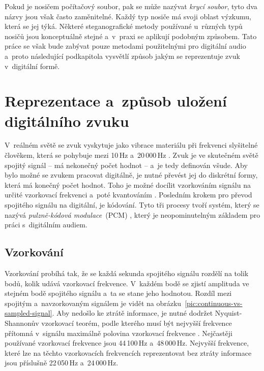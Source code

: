 Pokud je nosičem počítačový soubor, pak se může nazývat \textit{krycí soubor},
tyto dva názvy jsou však často zaměnitelné. Každý typ nosiče má svoji oblast
výzkumu, která se jej týká. Některé steganografické metody používané u~různých
typů nosičů jsou konceptuálně stejné a~v~praxi se aplikují podobným způsobem.
Tato práce se však bude zabývat pouze metodami použitelnými pro digitální
audio a~proto následující podkapitola vysvětlí způsob jakým se reprezentuje
zvuk v~digitální formě.

\section{Reprezentace a~způsob uložení digitálního zvuku}
\label{sec:digital-sound-representation}

V~reálném světě se zvuk vyskytuje jako vibrace materiálu při frekvenci
slyšitelné člověkem, která se pohybuje mezi 10\,Hz a~20\,000\,Hz
\cite{Swanson1998}. Zvuk je ve skutečném světě spojitý signál -- má nekonečný
počet hodnot -- a~je tedy definován všude. Aby bylo možné se zvukem pracovat
digitálně, je nutné převést jej do diskrétní formy, která má konečný počet
hodnot. Toho je možné docílit vzorkováním signálu na určité vzorkovací
frekvenci a~poté kvantováním \cite{Cernocky2021}. Posledním krokem pro převod
spojitého signálu na digitální, je kódování. Tyto tři procesy tvoří systém,
který se nazývá \textit{pulzně-kódová modulace}~(PCM) \cite{Oliver1948}, který
je neopominutelným základem pro práci s~digitálním audiem.

\subsection*{Vzorkování}
\label{sub:sampling}

Vzorkování probíhá tak, že se každá sekunda spojitého signálu rozdělí na tolik
bodů, kolik udává vzorkovací frekvence. V~každém bodě se zjistí amplituda ve
stejném bodě spojitého signálu a~ta se stane jeho hodnotou. Rozdíl mezi
spojitým a~navzorkovaným signálem je vidět na
obrázku~\ref{pic:continuous-vs-sampled-signal}. Aby nedošlo ke ztrátě
informace, je nutné dodržet Nyquist-Shannonův vzorkovací teorém, podle kterého
musí být nejvyšší frekvence přítomná v~signálu maximálně polovina vzorkovací
frekvence \cite{Shannon1949}. Nejčastěji používané vzorkovací frekvence jsou
44\,100\,Hz a~48\,000\,Hz. Nejvyšší frekvence, které lze na těchto vzorkovacích
frekvencích reprezentovat bez ztráty informace jsou příslušně 22\,050\,Hz
a~24\,000\,Hz.

